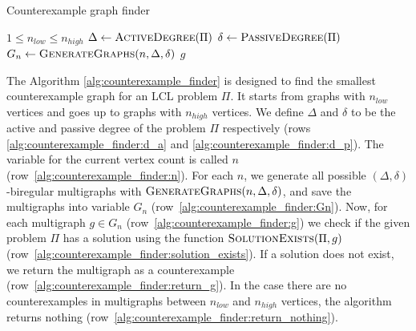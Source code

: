 \begin{algorithm}[H]
    \caption{Counterexample graph finder}
    \label{alg:counterexample_finder}
    \begin{algorithmic}[1] %
        \Require $1 \leq n_{low} \leq n_{high}$
          \label{alg:counterexample_finder:n_loop}
            \State $\Delta \gets \textsc{ActiveDegree}(\Pi)$ \label{alg:counterexample_finder:d_a}
            \State $\delta \gets \textsc{PassiveDegree}(\Pi)$ \label{alg:counterexample_finder:d_p}
              \label{alg:counterexample_finder:n}
                \State $G_n \gets \textsc{GenerateGraphs}(n, \Delta, \delta)$ \label{alg:counterexample_finder:Gn}
                 \label{alg:counterexample_finder:g}
                     \label{alg:counterexample_finder:solution_exists}
                        \State \Return $g$ \label{alg:counterexample_finder:return_g}
                    \EndIf
                \EndFor
            \EndFor
            \State \Return {} \label{alg:counterexample_finder:return_nothing}
        \EndFunction
    \end{algorithmic}
\end{algorithm}

The Algorithm \ref{alg:counterexample_finder} is designed to find the smallest counterexample graph for an LCL problem $\Pi$.
It starts from graphs with $n_{low}$ vertices and goes up to graphs with $n_{high}$ vertices.
We define $\Delta$ and $\delta$ to be the active and passive degree of the problem $\Pi$ respectively (rows \ref{alg:counterexample_finder:d_a} and \ref{alg:counterexample_finder:d_p}).
The variable for the current vertex count is called $n$ (row~\ref{alg:counterexample_finder:n}).
For each $n$, we generate all possible $(\Delta, \delta)$-biregular multigraphs with $\textsc{GenerateGraphs}(n, \Delta, \delta)$, and save the multigraphs into variable $G_n$ (row~\ref{alg:counterexample_finder:Gn}).
Now, for each multigraph $g \in G_n$ (row~\ref{alg:counterexample_finder:g}) we check if the given problem $\Pi$ has a solution using the function $\textsc{SolutionExists}(\Pi, g)$ (row~\ref{alg:counterexample_finder:solution_exists}).
If a solution does not exist, we return the multigraph as a counterexample (row~\ref{alg:counterexample_finder:return_g}).
In the case there are no counterexamples in multigraphs between $n_{low}$ and $n_{high}$ vertices, the algorithm returns nothing (row~\ref{alg:counterexample_finder:return_nothing}).

